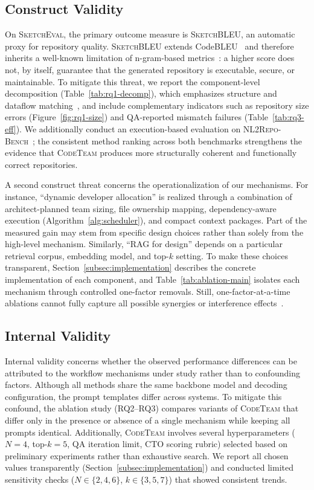 \documentclass[format=acmsmall, review=false, screen=true]{acmart}
\newcommand{\tool}{\textsc{CodeTeam}\xspace}
\newcommand{\sketcheval}{\textsc{SketchEval}\xspace}
\newcommand{\sketchbleu}{\textsc{SketchBLEU}\xspace}
\newcommand{\nlrepobench}{\textsc{NL2Repo-Bench}\xspace}
\begin{document}
\subsection{Construct Validity}\label{subsec:threats-construct}
On \sketcheval, the primary outcome measure is \sketchbleu, an automatic proxy for repository quality.
\sketchbleu extends CodeBLEU~\cite{Ren2020CodeBLEU} and therefore inherits a well-known limitation of n-gram-based metrics~\cite{Papineni2002BLEU}: a higher score does not, by itself, guarantee that the generated repository is executable, secure, or maintainable.
To mitigate this threat, we report the component-level decomposition (Table~\ref{tab:rq1-decomp}), which emphasizes structure and dataflow matching~\cite{Zan2025CodeS}, and include complementary indicators such as repository size errors (Figure~\ref{fig:rq1-size}) and QA-reported mismatch failures (Table~\ref{tab:rq3-eff}).
We additionally conduct an execution-based evaluation on \nlrepobench~\cite{Ding2025NL2RepoBench}; the consistent method ranking across both benchmarks strengthens the evidence that \tool produces more structurally coherent and functionally correct repositories.

A second construct threat concerns the operationalization of our mechanisms.
For instance, ``dynamic developer allocation'' is realized through a combination of architect-planned team sizing, file ownership mapping, dependency-aware execution (Algorithm~\ref{alg:scheduler}), and compact context packages.
Part of the measured gain may stem from specific design choices rather than solely from the high-level mechanism.
Similarly, ``RAG for design'' depends on a particular retrieval corpus, embedding model, and top-$k$ setting.
To make these choices transparent, Section~\ref{subsec:implementation} describes the concrete implementation of each component, and Table~\ref{tab:ablation-main} isolates each mechanism through controlled one-factor removals.
Still, one-factor-at-a-time ablations cannot fully capture all possible synergies or interference effects~\cite{Wohlin2012ESE}.

\subsection{Internal Validity}\label{subsec:threats-internal}
Internal validity concerns whether the observed performance differences can be attributed to the workflow mechanisms under study rather than to confounding factors.
Although all methods share the same backbone model and decoding configuration, the prompt templates differ across systems.
To mitigate this confound, the ablation study (RQ2--RQ3) compares variants of \tool that differ only in the presence or absence of a single mechanism while keeping all prompts identical.
Additionally, \tool involves several hyperparameters ($N{=}4$, top-$k{=}5$, QA iteration limit, CTO scoring rubric) selected based on preliminary experiments rather than exhaustive search.
We report all chosen values transparently (Section~\ref{subsec:implementation}) and conducted limited sensitivity checks ($N \in \{2, 4, 6\}$, $k \in \{3, 5, 7\}$) that showed consistent trends.
\end{document}
